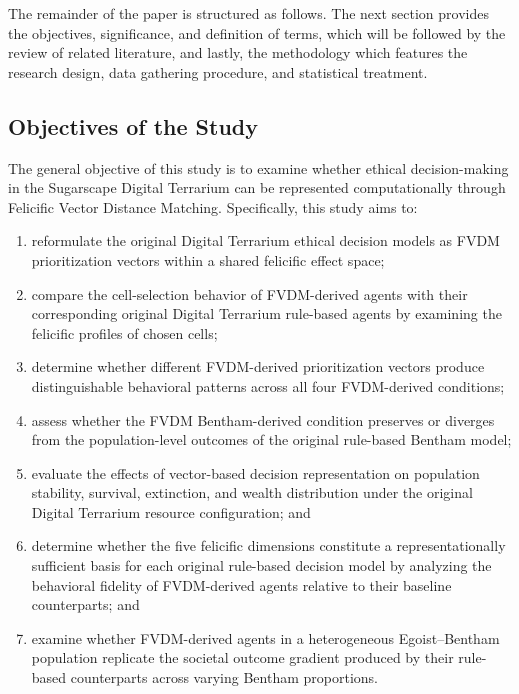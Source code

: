 \documentclass{icsthesis}
\begin{document}
\begin{mainmatter}
The remainder of the paper is structured as follows. The next section provides the objectives, significance, and definition of terms, which will be followed by the review of related literature, and lastly, the methodology which features the research design, data gathering procedure, and statistical treatment.

			\subsection{Objectives of the Study}
The general objective of this study is to examine whether ethical decision-making in the Sugarscape Digital Terrarium can be represented computationally through Felicific Vector Distance Matching. Specifically, this study aims to:

\begin{enumerate}
\item reformulate the original Digital Terrarium ethical decision models as FVDM prioritization vectors within a shared felicific effect space;
\item compare the cell-selection behavior of FVDM-derived agents with their corresponding original Digital Terrarium rule-based agents by examining the felicific profiles of chosen cells;
\item determine whether different FVDM-derived prioritization vectors produce distinguishable behavioral patterns across all four FVDM-derived conditions;
\item assess whether the FVDM Bentham-derived condition preserves or diverges from the population-level outcomes of the original rule-based Bentham model;
\item evaluate the effects of vector-based decision representation on population stability, survival, extinction, and wealth distribution under the original Digital Terrarium resource configuration; and
\item determine whether the five felicific dimensions constitute a representationally sufficient basis for each original rule-based decision model by analyzing the behavioral fidelity of FVDM-derived agents relative to their baseline counterparts; and
\item examine whether FVDM-derived agents in a heterogeneous Egoist--Bentham population replicate the societal outcome gradient produced by their rule-based counterparts across varying Bentham proportions.
\end{enumerate}



\end{mainmatter}
\end{document}

